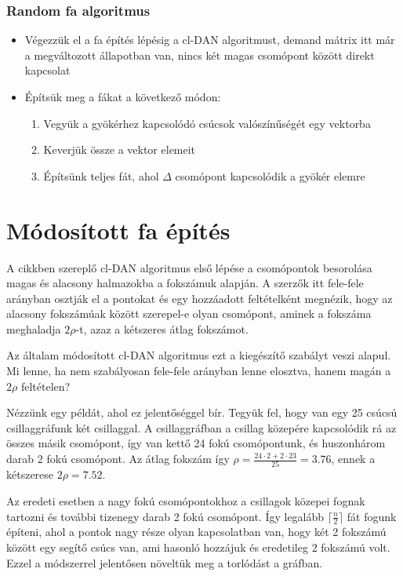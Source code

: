 \documentclass[12pt]{report}
\begin{document}
\subsubsection{Random fa algoritmus}
\begin{itemize}
	\item Végezzük el a fa építés lépésig a cl-DAN algoritmust, demand mátrix itt már a megváltozott állapotban van, nincs két magas csomópont között direkt kapcsolat
	\item Építsük meg a fákat a következő módon:
	\begin{enumerate}
		\item Vegyük a gyökérhez kapcsolódó csúcsok valószínűségét egy vektorba
		\item Keverjük össze a vektor elemeit
		\item Építsünk teljes fát, ahol $\Delta$ csomópont kapcsolódik a gyökér elemre
	\end{enumerate}
\end{itemize}

\section{Módosított fa építés}


A cikkben \cite{avin_demand-aware_nodate} szereplő cl-DAN algoritmus első lépése a csomópontok besorolása magas és alacsony halmazokba a fokszámuk alapján. 
A szerzők itt fele-fele arányban osztják el a pontokat és egy hozzáadott feltételként megnézik, hogy az alacsony fokszámúak között szerepel-e olyan csomópont, aminek a fokszáma meghaladja \(2\rho\)-t, azaz a kétszeres átlag fokszámot.

Az általam módosított cl-DAN algoritmus ezt a kiegészítő szabályt veszi alapul.
Mi lenne, ha nem szabályosan fele-fele arányban lenne elosztva, hanem magán a \(2\rho\) feltételen?

Nézzünk egy példát, ahol ez jelentőséggel bír.
Tegyük fel, hogy van egy 25 csúcsú csillaggráfunk két csillaggal.
A csillaggráfban a csillag közepére kapcsolódik rá az összes másik csomópont, így van kettő 24 fokú csomópontunk, és huszonhárom darab 2 fokú csomópont. 
Az átlag fokszám így \(\rho=\frac{24\cdot2+2\cdot23}{25}=3.76\), ennek a kétszerese \(2\rho=7.52\).

Az eredeti esetben a nagy fokú csomópontokhoz a csillagok közepei fognak tartozni és további tizenegy darab 2 fokú csomópont. 
Így legalább $\lceil\frac{n}{2}\rceil$ fát fogunk építeni, ahol a pontok nagy része olyan kapcsolatban van, hogy két 2 fokszámú között egy segítő csúcs van, ami hasonló hozzájuk és eredetileg 2 fokszámú volt. 
Ezzel a módszerrel jelentősen növeltük meg a torlódást a gráfban.
\end{document}

